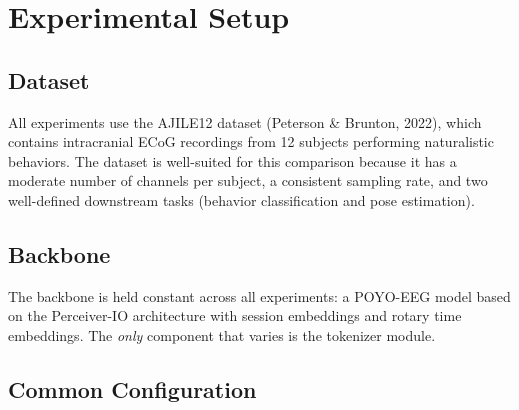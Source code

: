 \documentclass[11pt, a4paper]{article}
\begin{document}
\section{Experimental Setup}
\label{sec:setup}

\subsection{Dataset}

All experiments use the AJILE12 dataset (Peterson \& Brunton, 2022),
which contains intracranial ECoG recordings from 12 subjects performing
naturalistic behaviors. The dataset is well-suited for this comparison
because it has a moderate number of channels per subject, a consistent
sampling rate, and two well-defined downstream tasks (behavior
classification and pose estimation).

\subsection{Backbone}

The backbone is held constant across all experiments: a POYO-EEG model
based on the Perceiver-IO architecture with session embeddings and
rotary time embeddings. The \emph{only} component that varies is the
tokenizer module.

\subsection{Common Configuration}
\end{document}
